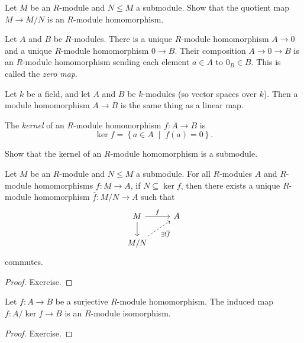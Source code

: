 \documentclass[a4paper,11pt]{article}
\begin{document}
    \begin{exercise}
      Let \(M\) be an \(R\)-module and \(N \le M\) a submodule. Show that the quotient map \(M \to M/N\) is an \(R\)-module homomorphism.
    \end{exercise}

    \begin{example}
      Let \(A\) and \(B\) be \(R\)-modules. There is a unique \(R\)-module homomorphism \(A \to 0\) and a unique \(R\)-module homomorphism \(0 \to B\). Their composition \(A \to 0 \to B\) is an \(R\)-module homomorphism sending each element \(a \in A\) to \(0_B \in B\). This is called the \emph{zero map}.
    \end{example}

    \begin{example}
      Let \(k\) be a field, and let \(A\) and \(B\) be \(k\)-modules (so vector spaces over \(k\)). Then a module homomorphism \(A \to B\) is the same thing as a linear map.
    \end{example}

    \begin{definition}
      The \emph{kernel} of an \(R\)-module homomorphism \(f: A \to B\) is
      \[
        \ker f = \left\{ a \in A \; \middle| \; f(a) = 0 \right\}.
      \]
    \end{definition}

    \begin{exercise}
      Show that the kernel of an \(R\)-module homomorphism is a submodule.
    \end{exercise}

    \begin{proposition}
      Let \(M\) be an \(R\)-module and \(N \le M\) a submodule. For all \(R\)-modules \(A\) and \(R\)-module homomorphisms \(f: M \to A\), if \(N \subseteq \ker f\), then there exists a unique \(R\)-module homomorphism \(\overline{f}: M/N \to A\) such that
      \[
        \begin{tikzcd}
          M \arrow[r,"f"] \arrow[d] & A \\
          M/N \arrow[ru,"\exists!\overline{f}"',dashed] & {}
        \end{tikzcd}
      \]
      commutes.
    \end{proposition}
    \begin{proof}
      Exercise.
    \end{proof}

    \begin{theorem}
      Let \(f: A \to B\) be a surjective \(R\)-module homomorphism. The induced map \(\overline{f}: A/\ker f \to B\) is an \(R\)-module isomorphism.
    \end{theorem}
    \begin{proof}
      Exercise.
    \end{proof}
\end{document}
